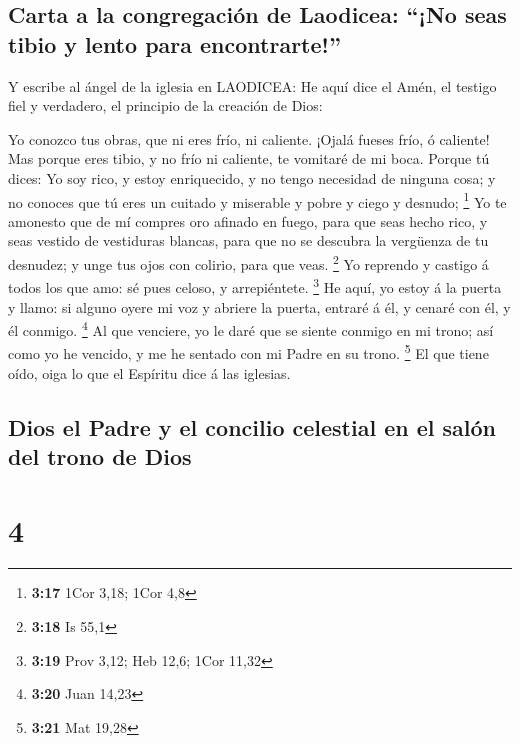 \hypertarget{carta-a-la-congregaciuxf3n-de-laodicea-no-seas-tibio-y-lento-para-encontrarte}{%
\subsection{Carta a la congregación de Laodicea: ``¡No seas tibio y
lento para
encontrarte!''}\label{carta-a-la-congregaciuxf3n-de-laodicea-no-seas-tibio-y-lento-para-encontrarte}}

 Y escribe al ángel de la iglesia en LAODICEA: He aquí
dice el Amén, el testigo fiel y verdadero, el principio de la creación
de Dios:

 Yo conozco tus obras, que ni eres frío, ni caliente.
¡Ojalá fueses frío, ó caliente!  Mas porque eres tibio, y
no frío ni caliente, te vomitaré de mi boca.  Porque tú
dices: Yo soy rico, y estoy enriquecido, y no tengo necesidad de ninguna
cosa; y no conoces que tú eres un cuitado y miserable y pobre y ciego y
desnudo; \footnote{\textbf{3:17} 1Cor 3,18; 1Cor 4,8}  Yo
te amonesto que de mí compres oro afinado en fuego, para que seas hecho
rico, y seas vestido de vestiduras blancas, para que no se descubra la
vergüenza de tu desnudez; y unge tus ojos con colirio, para que veas.
\footnote{\textbf{3:18} Is 55,1}  Yo reprendo y castigo á
todos los que amo: sé pues celoso, y arrepiéntete. \footnote{\textbf{3:19}
  Prov 3,12; Heb 12,6; 1Cor 11,32}  He aquí, yo estoy á
la puerta y llamo: si alguno oyere mi voz y abriere la puerta, entraré á
él, y cenaré con él, y él conmigo. \footnote{\textbf{3:20} Juan 14,23}
 Al que venciere, yo le daré que se siente conmigo en mi
trono; así como yo he vencido, y me he sentado con mi Padre en su trono.
\footnote{\textbf{3:21} Mat 19,28}  El que tiene oído,
oiga lo que el Espíritu dice á las iglesias.

\hypertarget{dios-el-padre-y-el-concilio-celestial-en-el-saluxf3n-del-trono-de-dios}{%
\subsection{Dios el Padre y el concilio celestial en el salón del trono
de
Dios}\label{dios-el-padre-y-el-concilio-celestial-en-el-saluxf3n-del-trono-de-dios}}

\hypertarget{section-3}{%
\section{4}\label{section-3}}

